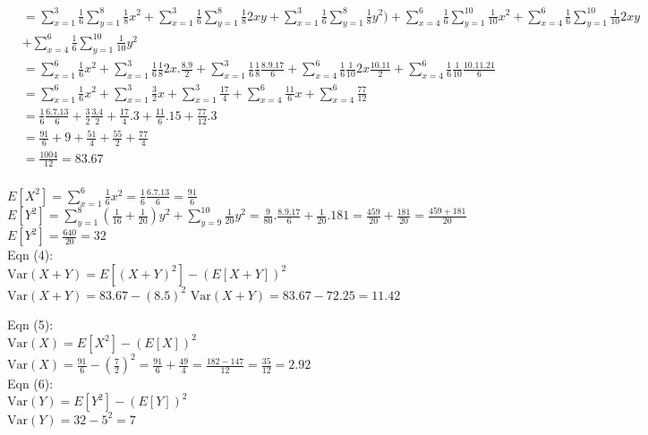 \documentclass[addpoints]{exam}
\newcommand{\var}{\text{Var}}
\begin{document}
\begin{questions}
\begin{parts}
\begin{solution}
\begin{align*}
&= \sum_{x=1}^3 \frac{1}{6}\sum_{y=1}^8 \frac{1}{ 8} x^2 + \sum_{x=1}^3 \frac{1}{6}\sum_{y=1}^8 \frac{1}{ 8}2xy + \sum_{x=1}^3 \frac{1}{6}\sum_{y=1}^8 \frac{1}{ 8}y^2) + \sum_{x=4}^{6}\frac{1}{6}\sum_{y=1}^{10}\frac {1}{10}x^2 + \sum_{x=4}^{6}\frac{1}{6}\sum_{y=1}^{10}\frac {1}{10}2xy \\&+ \sum_{x=4}^{6}\frac{1}{6}\sum_{y=1}^{10}\frac {1}{10}y^2\\
&= \sum_{x=1}^6 \frac{1}{6}x^2 + \sum_{x=1}^3 \frac{1}{6}\frac{1}{ 8}2x.\frac{8.9}{2} + \sum_{x=1}^3 \frac{1}{6} \frac{1}{8} \frac{8.9.17}{6} + \sum_{x=4}^{6}\frac{1}{6}\frac {1}{10}2x\frac{10.11}{2} + \sum_{x=4}^{6}\frac{1}{6}\frac {1}{10}\frac{10.11.21}{6} \\
&= \sum_{x=1}^6 \frac{1}{6}x^2 + \sum_{x=1}^3 \frac{3}{2}x + \sum_{x=1}^3 \frac{17}{4} + \sum_{x=4}^{6}\frac{11}{6}x + \sum_{x=4}^{6}\frac{77}{12} \\
&= \frac{1}{6}\frac{6.7.13}{6} + \frac{3}{2}\frac{3.4}{2} +\frac{17}{4}.3 + \frac{11}{6}.15 +\frac{77}{12}.3 \\
&= \frac{91}{6} + 9 + \frac{51}{4} + \frac{55}{2} + \frac{77}{4}\\
&= \frac{1004}{12} = 83.67\\
\end{align*}

$E[X^2] = \sum_{x=1}^{6} \frac{1}{6} x^2 = \frac{1}{6} \frac{6.7.13}{6} = \frac{91}{6}$\\

$E[Y^2] = \sum_{y=1}^8 (\frac{1}{16}+\frac{1}{20})y^2 +\sum_{y=9}^{10}\frac{1}{20} y^2 = \frac{9}{80}.\frac{8.9.17}{6} + \frac{1}{20}.181 = \frac{459}{20}+\frac{181}{20} = \frac{459+181}{20}$  \\
$E[Y^2] = \frac{640}{20} = 32$\\

Eqn (4):\\
$\var(X + Y) = E[(X+Y)^2] - (E[X+Y])^2$
$\var(X + Y) = 83.67 - (8.5)^2$
$\var(X + Y) = 83.67 - 72.25 = 11.42$

Eqn (5):\\
$\var(X) = E[X^2] - (E[X])^2$\\
$\var(X) = \frac{91}{6} - (\frac{7}{2})^2 = \frac{91}{6} + \frac{49}{4} = \frac{182-147}{12} = \frac{35}{12} = 2.92$\\

Eqn (6):\\
$\var(Y) = E[Y^2] - (E[Y])^2$\\
$\var(Y) = 32 - 5^2 = 7$\\



\end{solution}
\end{parts}
\end{questions}
\end{document}
